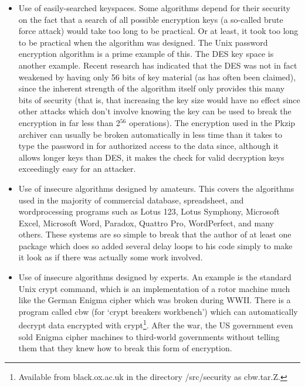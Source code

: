 \begin{itemize}

\item Use of easily-searched keyspaces.  Some algorithms depend for their security
  on the fact that a search of all possible encryption keys (a so-called brute
  force attack) would take too long to be practical.  Or at least, it took too
  long to be practical when the algorithm was designed.  The Unix password
  encryption algorithm is a prime example of this.  The DES key space is
  another example.  Recent research has indicated that the DES was not in fact
  weakened by having only 56 bits of key material (as has often been claimed),
  since the inherent strength of the algorithm itself only provides this many
  bits of security (that is, that increasing the key size would have no effect
  since other attacks which don't involve knowing the key can be used to break
  the encryption in far less than 2$^{56}$ operations).  The encryption used in the
  Pkzip archiver can usually be broken automatically in less time than it takes
  to type the password in for authorized access to the data since, although it
  allows longer keys than DES, it makes the check for valid decryption keys
  exceedingly easy for an attacker.

\item Use of insecure algorithms designed by amateurs.  This covers the algorithms
  used in the majority of commercial database, spreadsheet, and wordprocessing
  programs such as Lotus 123, Lotus Symphony, Microsoft Excel, Microsoft Word,
  Paradox, Quattro Pro, WordPerfect, and many others.  These systems are so
  simple to break that the author of at least one package which does so added
  several delay loops to his code simply to make it look as if there was
  actually some work involved.

\item Use of insecure algorithms designed by experts.  An example is the standard
  Unix crypt command, which is an implementation of a rotor machine much like
  the German Enigma cipher which was broken during WWII.  There is a program
  called cbw (for `crypt breakers workbench') which can automatically decrypt
  data encrypted with crypt\footnote{
		Available from black.ox.ac.uk in the directory /src/security as
		cbw.tar.Z.
  }.  After the war, the US government even sold 
  Enigma cipher machines to third-world governments without telling them that 
  they knew how to break this form of encryption.


\end{itemize}
